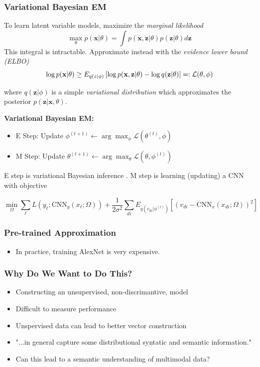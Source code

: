 \documentclass{beamer}
\begin{document}
\begin{frame}
  \frametitle{Variational Bayesian EM}
  To learn latent variable models, maximize the \emph{marginal likelihood}
  \[
  \max_{\theta}p(\mathbf{x}|\theta)=\int p(\mathbf{x},\mathbf{z}|\theta)p(\mathbf{z}|\theta)d\mathbf{z}
  \]
  This integral is intractable. Approximate instead with the \emph{evidence lower bound (ELBO)}
  \[
  \log p(\mathbf{x}|\theta)\geq E_{q(z|\phi)}\left[\log p(\mathbf{x},\mathbf{z}|\theta)-\log q(\mathbf{z}|\theta)\right]=:{\cal L}(\theta,\phi)
  \]
  {\small where $q(\mathbf{z}|\phi)$ is a simple \emph{variational distribution} which approximates the posterior $p(\mathbf{z}|\mathbf{x},\theta)$. \par}
  \textbf{Variational Bayesian EM:}
  \begin{itemize}
  \item E Step: Update $\phi^{(t+1)}\leftarrow\arg\max_{\phi}\mathcal{L}(\theta^{(t)},\phi)$
  \item M Step: Update $\theta^{(t+1)}\leftarrow\arg\max_{\theta}\mathcal{L}(\theta,\phi^{(t)})$
  \end{itemize}
  {\small 
    E step is variational Bayesian inference \citep{WangC13, Ranganath14}. M step is learning (updating) a CNN with objective
    \par}
  \[ \min_\Omega \sum_\ell L(y_\ell ; \text{CNN}_y(x_\ell ; \Omega)) + \frac{1}{2\sigma^2} \sum_{di} E_{q(v_{di}|\phi^(t))} \left[ (v_{di} - \text{CNN}_x(x_{di} ; \Omega))^2 \right] \]
\end{frame}

\begin{frame}
  \frametitle{Pre-trained Approximation}
  \begin{itemize}
    \item In practice, training AlexNet is very expensive.
   
  \end{itemize}
\end{frame}

\begin{frame}
  \frametitle{Why Do We Want to Do This?}
  \begin{itemize}
  \item Constructing an unsupervised, non-discrimantive, model
  \item Difficult to measure performance \citep{Wallach09a}
  \item Unspervised data can lead to better vector construction
  \item "...in general capture some distributional syntatic and semantic information." \citep{Socher13a}
  \item Can this lead to a semantic understanding of multimodal data?
  \end{itemize}
\end{frame}
\end{document}
